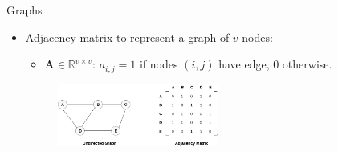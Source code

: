 \documentclass{beamer}
\begin{document}
\begin{frame}{Graphs}
         \begin{itemize}
        \item  Adjacency matrix to represent a graph of $v$ nodes:
         \begin{itemize}
            \footnotesize
            \item  $\mathbf{A} \in \mathbb{R}^{v\times v}$: $a_{i, j}=1$ if nodes $(i, j)$ have edge, $0$ otherwise.
        \end{itemize}

        \begin{figure}[!htb]
        \centering
        \includegraphics[width=0.5\textwidth]{figs/adjacency matrix.png}
        \end{figure}
    \end{itemize}
\end{frame}
\end{document}
